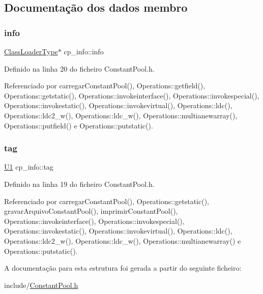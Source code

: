 \subsection{Documentação dos dados membro}
\mbox{\label{structcp__info_aafa07de27e22632ed56ab8fbffbe2559}} 
\subsubsection{\texorpdfstring{info}{info}}
{\footnotesize\ttfamily \hyperlink{unionClassLoaderType}{Class\+Loader\+Type}$\ast$ cp\+\_\+info\+::info}



Definido na linha 20 do ficheiro Constant\+Pool.\+h.



Referenciado por carregar\+Constant\+Pool(), Operations\+::getfield(), Operations\+::getstatic(), Operations\+::invokeinterface(), Operations\+::invokespecial(), Operations\+::invokestatic(), Operations\+::invokevirtual(), Operations\+::ldc(), Operations\+::ldc2\+\_\+w(), Operations\+::ldc\+\_\+w(), Operations\+::multianewarray(), Operations\+::putfield() e Operations\+::putstatic().

\mbox{\label{structcp__info_a850b66fa196e9fc2e898ca41d558e248}} 
\subsubsection{\texorpdfstring{tag}{tag}}
{\footnotesize\ttfamily \hyperlink{BasicTypes_8h_a9bffe5bb2564f91cd90fb7d06848f9a8}{U1} cp\+\_\+info\+::tag}



Definido na linha 19 do ficheiro Constant\+Pool.\+h.



Referenciado por carregar\+Constant\+Pool(), Operations\+::getstatic(), gravar\+Arquivo\+Constant\+Pool(), imprimir\+Constant\+Pool(), Operations\+::invokeinterface(), Operations\+::invokespecial(), Operations\+::invokestatic(), Operations\+::invokevirtual(), Operations\+::ldc(), Operations\+::ldc2\+\_\+w(), Operations\+::ldc\+\_\+w(), Operations\+::multianewarray() e Operations\+::putstatic().



A documentação para esta estrutura foi gerada a partir do seguinte ficheiro\+:\begin{DoxyCompactItemize}
\item 
include/\hyperlink{ConstantPool_8h}{Constant\+Pool.\+h}\end{DoxyCompactItemize}
